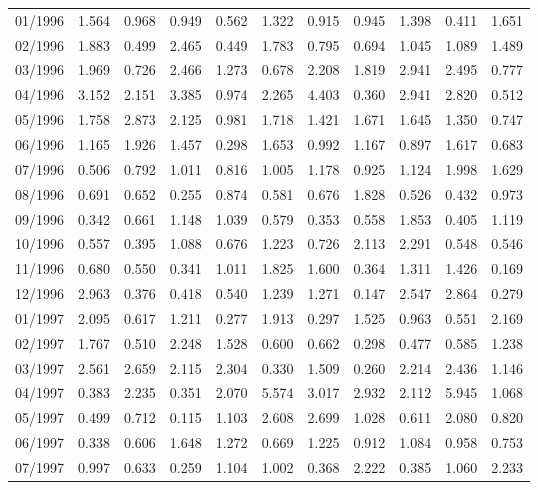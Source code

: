 \begin{tabular}{lrrrrrrrrrr}
01/1996 &  1.564 &  0.968 &  0.949 &  0.562 &  1.322 &  0.915 &  0.945 &  1.398 &  0.411 &  1.651 \\
02/1996 &  1.883 &  0.499 &  2.465 &  0.449 &  1.783 &  0.795 &  0.694 &  1.045 &  1.089 &  1.489 \\
03/1996 &  1.969 &  0.726 &  2.466 &  1.273 &  0.678 &  2.208 &  1.819 &  2.941 &  2.495 &  0.777 \\
04/1996 &  3.152 &  2.151 &  3.385 &  0.974 &  2.265 &  4.403 &  0.360 &  2.941 &  2.820 &  0.512 \\
05/1996 &  1.758 &  2.873 &  2.125 &  0.981 &  1.718 &  1.421 &  1.671 &  1.645 &  1.350 &  0.747 \\
06/1996 &  1.165 &  1.926 &  1.457 &  0.298 &  1.653 &  0.992 &  1.167 &  0.897 &  1.617 &  0.683 \\
07/1996 &  0.506 &  0.792 &  1.011 &  0.816 &  1.005 &  1.178 &  0.925 &  1.124 &  1.998 &  1.629 \\
08/1996 &  0.691 &  0.652 &  0.255 &  0.874 &  0.581 &  0.676 &  1.828 &  0.526 &  0.432 &  0.973 \\
09/1996 &  0.342 &  0.661 &  1.148 &  1.039 &  0.579 &  0.353 &  0.558 &  1.853 &  0.405 &  1.119 \\
10/1996 &  0.557 &  0.395 &  1.088 &  0.676 &  1.223 &  0.726 &  2.113 &  2.291 &  0.548 &  0.546 \\
11/1996 &  0.680 &  0.550 &  0.341 &  1.011 &  1.825 &  1.600 &  0.364 &  1.311 &  1.426 &  0.169 \\
12/1996 &  2.963 &  0.376 &  0.418 &  0.540 &  1.239 &  1.271 &  0.147 &  2.547 &  2.864 &  0.279 \\
01/1997 &  2.095 &  0.617 &  1.211 &  0.277 &  1.913 &  0.297 &  1.525 &  0.963 &  0.551 &  2.169 \\
02/1997 &  1.767 &  0.510 &  2.248 &  1.528 &  0.600 &  0.662 &  0.298 &  0.477 &  0.585 &  1.238 \\
03/1997 &  2.561 &  2.659 &  2.115 &  2.304 &  0.330 &  1.509 &  0.260 &  2.214 &  2.436 &  1.146 \\
04/1997 &  0.383 &  2.235 &  0.351 &  2.070 &  5.574 &  3.017 &  2.932 &  2.112 &  5.945 &  1.068 \\
05/1997 &  0.499 &  0.712 &  0.115 &  1.103 &  2.608 &  2.699 &  1.028 &  0.611 &  2.080 &  0.820 \\
06/1997 &  0.338 &  0.606 &  1.648 &  1.272 &  0.669 &  1.225 &  0.912 &  1.084 &  0.958 &  0.753 \\
07/1997 &  0.997 &  0.633 &  0.259 &  1.104 &  1.002 &  0.368 &  2.222 &  0.385 &  1.060 &  2.233 \\

\end{tabular}
